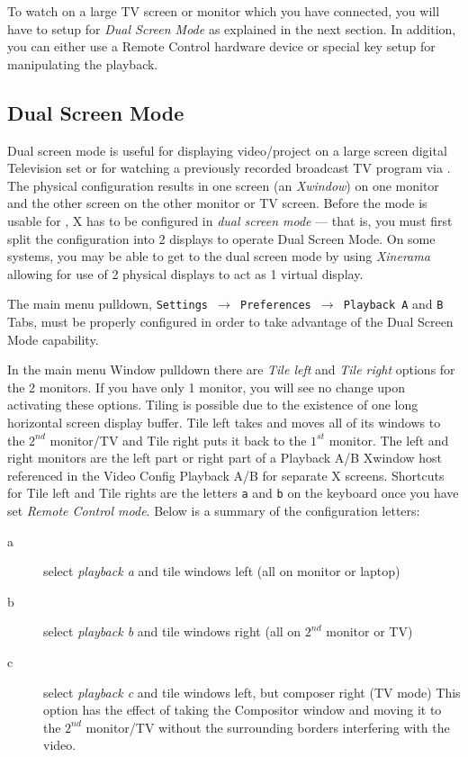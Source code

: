 To watch on a large TV screen or monitor which you have connected, you will have to setup for \textit{Dual Screen Mode} as explained in the next section.  In addition, you can either use a Remote Control hardware device or special key setup for manipulating the playback.

\subsection{Dual Screen Mode}%
\label{sub:dual_screen_mode}

Dual screen mode is useful for displaying \CGG{} video/project on a large screen digital Television set or for watching a previously recorded broadcast TV program via \CGG{}.  The physical configuration results in one screen (an \textit{Xwindow}) on one monitor and the other screen on the other monitor or TV screen.  Before the mode is usable for \CGG{}, X has to be configured in \textit{dual screen mode} --- that is, you must first split the configuration into 2 displays to operate Dual Screen Mode.  On some systems, you may be able to get to the dual screen mode by using \textit{Xinerama} allowing for use of 2 physical displays to act as 1 virtual display.

The main menu pulldown, \texttt{Settings $\rightarrow$ Preferences $\rightarrow$ Playback A} and \texttt{B} Tabs, must be properly configured in order to take advantage of the Dual Screen Mode capability.

In the main menu Window pulldown there are \textit{Tile left} and \textit{Tile right} options for the 2 monitors.  If you have only 1 monitor, you will see no change upon activating these options.  Tiling is possible due to the existence of one long horizontal screen display buffer. Tile left takes \CGG{} and moves all of its windows to the $2^{nd}$ monitor/TV and Tile right puts it back to the $1^{st}$ monitor.  The left and right monitors are the left part or right part of a Playback A/B Xwindow host referenced in the Video Config Playback A/B for separate X screens.  Shortcuts for Tile left and Tile rights are the letters \texttt{a} and \texttt{b} on the keyboard once you have set \textit{Remote Control mode}.  Below is a summary of the configuration letters:

\begin{description}
    \item[a] select \textit{playback a} and tile windows left (all on monitor or laptop)
    \item[b] select \textit{playback b} and tile windows right (all on $2^{nd}$ monitor or TV)
    \item[c] select \textit{playback c} and tile windows left, but composer right (TV mode) This option has the effect of taking the Compositor window and moving it to the $2^{nd}$ monitor/TV without the surrounding borders interfering with the video.
\end{description}

